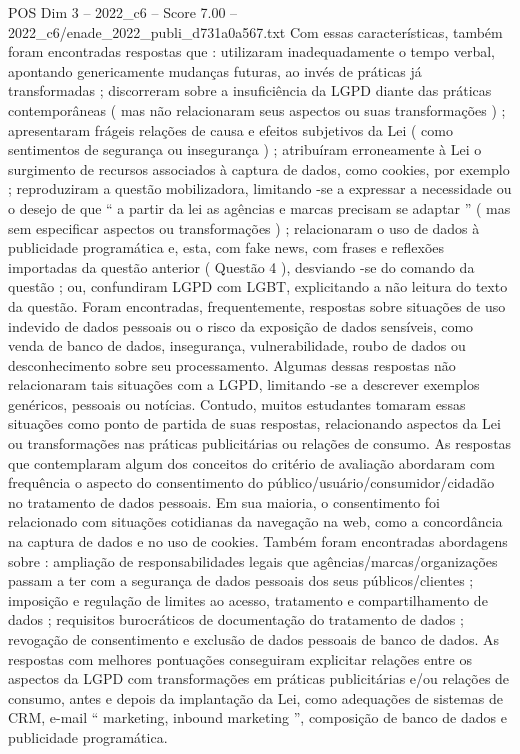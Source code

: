 \begin{textsample}{POS Dim 3 – 2022\_c6 – Score 7.00 – 2022\_c6/enade\_2022\_publi\_d731a0a567.txt}
Com essas características, também foram encontradas respostas que : utilizaram inadequadamente o tempo verbal, apontando genericamente mudanças futuras, ao invés de práticas já transformadas ; discorreram sobre a insuficiência da LGPD diante das práticas contemporâneas ( mas não relacionaram seus aspectos ou suas transformações ) ; apresentaram frágeis relações de causa e efeitos subjetivos da Lei ( como sentimentos de segurança ou insegurança ) ; atribuíram erroneamente à Lei o surgimento de recursos associados à captura de dados, como cookies, por exemplo ; reproduziram a questão mobilizadora, limitando -se a expressar a necessidade ou o desejo de que “ a partir da lei as agências e marcas precisam se adaptar ” ( mas sem especificar aspectos ou transformações ) ; relacionaram o uso de dados à publicidade programática e, esta, com fake news, com frases e reflexões importadas da questão anterior ( Questão 4 ), desviando -se do comando da questão ; ou, confundiram LGPD com LGBT, explicitando a não leitura do texto da questão.
Foram encontradas, frequentemente, respostas sobre situações de uso indevido de dados pessoais ou o risco da exposição de dados sensíveis, como venda de banco de dados, insegurança, vulnerabilidade, roubo de dados ou desconhecimento sobre seu processamento.
Algumas dessas respostas não relacionaram tais situações com a LGPD, limitando -se a descrever exemplos genéricos, pessoais ou notícias.
Contudo, muitos estudantes tomaram essas situações como ponto de partida de suas respostas, relacionando aspectos da Lei ou transformações nas práticas publicitárias ou relações de consumo.
As respostas que contemplaram algum dos conceitos do critério de avaliação abordaram com frequência o aspecto do consentimento do público/usuário/consumidor/cidadão no tratamento de dados pessoais.
Em sua maioria, o consentimento foi relacionado com situações cotidianas da navegação na web, como a concordância na captura de dados e no uso de cookies.
Também foram encontradas abordagens sobre : ampliação de responsabilidades legais que agências/marcas/organizações passam a ter com a segurança de dados pessoais dos seus públicos/clientes ; imposição e regulação de limites ao acesso, tratamento e compartilhamento de dados ; requisitos burocráticos de documentação do tratamento de dados ; revogação de consentimento e exclusão de dados pessoais de banco de dados.
As respostas com melhores pontuações conseguiram explicitar relações entre os aspectos da LGPD com transformações em práticas publicitárias e/ou relações de consumo, antes e depois da implantação da Lei, como adequações de sistemas de CRM, e-mail “ marketing, inbound marketing ”, composição de banco de dados e publicidade programática.

\end{textsample}

